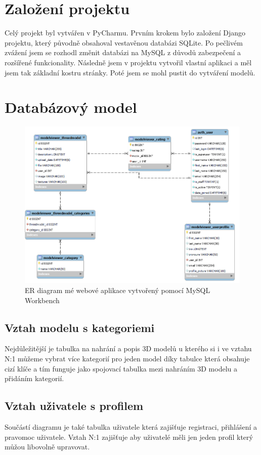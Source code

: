 \documentclass[12pt, a4paper,
oneside,      %
openright
]{report}
\begin{document}
	\section[Založení projektu]{Založení projektu}
	Celý projekt byl vytvářen v PyCharmu. Prvním krokem bylo založení Django projektu, který původně obsahoval vestavěnou databázi SQLite. Po pečlivém zvážení jsem se rozhodl změnit databázi na MySQL z důvodů zabezpečení a rozšířené funkcionality. Následně jsem v projektu vytvořil vlastní aplikaci a měl jsem tak základní kostru stránky. Poté jsem se mohl pustit do vytváření modelů.
	\section[Databázový model]{Databázový model}
		\begin{figure}[h]
			\centering
			\includegraphics[width=0.9\linewidth]{image/mvt-model.png} 
			\caption{ER diagram mé webové aplikace vytvořený pomocí MySQL Workbench}
		\end{figure}
		\clearpage
		\subsection[Vztah modelu s kategoriemi]{Vztah modelu s kategoriemi} Nejdůležitější je tabulka na nahrání a popis 3D modelů u kterého si i ve vztahu N:1 můžeme vybrat více kategorií pro jeden model díky tabulce která obsahuje cizí klíče a tím funguje jako spojovací tabulka mezi nahráním 3D modelu a přidáním kategorií.
		\subsection[Vztah uživatele s profilem]{Vztah uživatele s profilem}
		Součástí diagramu je také tabulka uživatele která zajišťuje registraci, přihlášení a pravomoc uživatele. Vztah N:1 zajišťuje aby uživatelé měli jen jeden profil který můžou libovolně upravovat.
\end{document}
